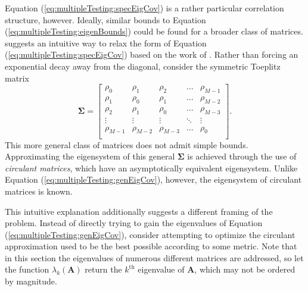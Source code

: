 \documentclass[letterpaper,12pt,oneside,final]{article}
\newcommand{\m}[1]{\mathbf{#1}}               %
\newcommand{\sm}[1]{\boldsymbol{#1}}   %
\begin{document}
Equation (\ref{eq:multipleTesting:specEigCov}) is a rather particular correlation structure, however. Ideally, similar bounds to Equation (\ref{eq:multipleTesting:eigenBounds}) could be found for a broader class of matrices. \cite{gray2006toeplitz} suggests an intuitive way to relax the form of Equation (\ref{eq:multipleTesting:specEigCov}) based on the work of \cite{grenanderszego1958}. Rather than forcing an exponential decay away from the diagonal, consider the symmetric Toeplitz matrix
\begin{equation} \label{eq:multipleTesting:genEigCov}
  \sm{\Sigma} = 
  \begin{bmatrix}
    \rho_0 & \rho_1 & \rho_2 & \dots & \rho_{M-1} \\
    \rho_1 & \rho_0 & \rho_1 & \dots & \rho_{M-2} \\
    \rho_2 & \rho_1 & \rho_0 & \dots & \rho_{M-3} \\
    \vdots & \vdots & \vdots & \ddots & \vdots \\
    \rho_{M-1} & \rho_{M-2} & \rho_{M-3} & \dots & \rho_0 \\
  \end{bmatrix}.
\end{equation}
This more general class of matrices does not admit simple bounds. Approximating the eigensystem of this general $\sm{\Sigma}$ is achieved through the use of \emph{circulant matrices}, which have an asymptotically equivalent eigensystem. Unlike Equation (\ref{eq:multipleTesting:genEigCov}), however, the eigensystem of circulant matrices is known.

This intuitive explanation additionally suggests a different framing of the problem. Instead of directly trying to gain the eigenvalues of Equation (\ref{eq:multipleTesting:genEigCov}), consider attempting to optimize the circulant approximation used to be the best possible according to some metric. Note that in this section the eigenvalues of numerous different matrices are addressed, so let the function $\lambda_k(\m{A})$ return the $k^{\text{th}}$ eigenvalue of $\m{A}$, which may not be ordered by magnitude.
\end{document}
